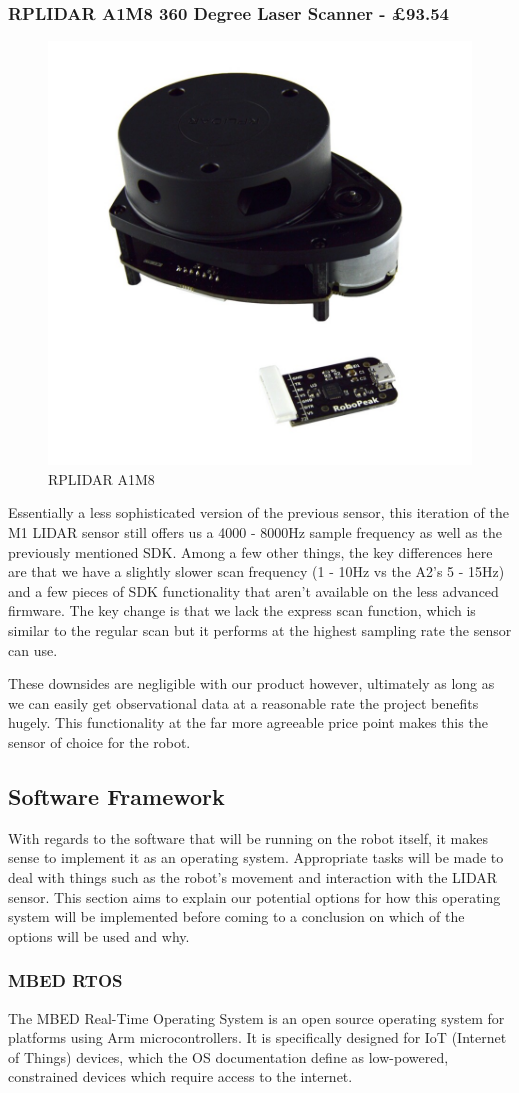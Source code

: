 					\subsubsection{RPLIDAR A1M8 360 Degree Laser Scanner - \pounds{93.54}}
					\begin{figure}[h]
						\centering
						\includegraphics[width=.3\linewidth]{ANALYSIS/rplidara1.jpg}
						\caption{RPLIDAR A1M8}
						\label{fig:rplidara1m8}
					\end{figure}
					Essentially a less sophisticated version of the previous sensor, this iteration of the M1 LIDAR sensor still offers us a 4000 - 8000Hz sample frequency as well as the previously mentioned SDK. Among a few other things, the key differences here are that we have a slightly slower scan frequency (1 - 10Hz vs the A2's 5 - 15Hz) and a few pieces of SDK functionality that aren't available on the less advanced firmware. The key change is that we lack the express scan function, which is similar to the regular scan but it performs at the highest sampling rate the sensor can use. 
					
					These downsides are negligible with our product however, ultimately as long as we can easily get observational data at a reasonable rate the project benefits hugely. This functionality at the far more agreeable price point makes this the sensor of choice for the robot.
				
				\subsection{Software Framework}
				With regards to the software that will be running on the robot itself, it makes sense to implement it as an operating system. Appropriate tasks will be made to deal with things such as the robot's movement and interaction with the LIDAR sensor. This section aims to explain our potential options for how this operating system will be implemented before coming to a conclusion on which of the options will be used and why.
				
					\subsubsection{MBED RTOS}
					The MBED Real-Time Operating System is an open source operating system for platforms using Arm microcontrollers. It is specifically designed for IoT (Internet of Things) devices, which the OS documentation\citep{mbedrtosdocs} define as low-powered, constrained devices which require access to the internet.
					
